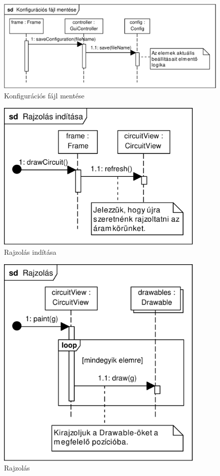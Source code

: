 \begin{figure}[h]
\begin{center}
\includegraphics[width=17cm]{chapters/chapter11/pdfs/4_saveconfig.pdf}
\caption{Konfigurációs fájl mentése}
\label{fig:saveconfig}
\end{center}
\end{figure}

\begin{figure}[h]
\begin{center}
\includegraphics[width=10cm]{chapters/chapter11/pdfs/5_paint1.pdf}
\caption{Rajzolás indítása}
\label{fig:paint1}
\end{center}
\end{figure}

\begin{figure}[h]
\begin{center}
\includegraphics[width=10cm]{chapters/chapter11/pdfs/6_paint2.pdf}
\caption{Rajzolás}
\label{fig:paint2}
\end{center}
\end{figure}


